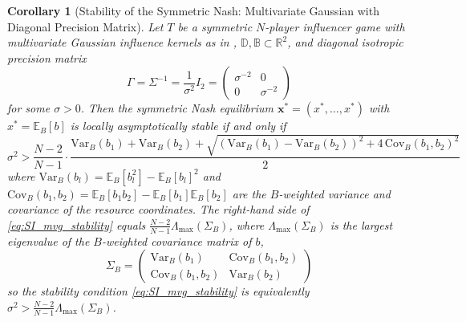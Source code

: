 \documentclass{article}
\newtheorem{corollary}{Corollary}[theorem]
\begin{document}
            \begin{corollary}[Stability of the Symmetric Nash: Multivariate Gaussian with 
                Diagonal Precision Matrix]\label{cor:SI_mvg_stability}Let $T$ be a symmetric $N$-player influencer game with multivariate Gaussian influence kernels as in , $\mathbb{D}, \mathbb{B} \subset \mathbb{R}^2$, and diagonal isotropic precision matrix
                \begin{equation}
                    \Gamma = \Sigma^{-1} = \frac{1}{\sigma^2}I_2 = 
                    \begin{pmatrix} 
                        \sigma^{-2} & 0 \\ 
                        0 & \sigma^{-2} 
                    \end{pmatrix}
                \end{equation}
                for some $\sigma > 0$. Then the symmetric Nash equilibrium $\mathbf{x}^* = (x^*,\ldots,x^*)$ with $x^* = \mathbb{E}_B[b]$ is locally asymptotically stable if and only if
                \begin{equation}\label{eq:SI_mvg_stability}
                    \sigma^2 > \frac{N-2}{N-1}\cdot\frac{\mathrm{Var}_B(b_1) + \mathrm{Var}_B(b_2) + \sqrt{\left(\mathrm{Var}_B(b_1) - \mathrm{Var}_B(b_2)\right)^2 + 4\,\mathrm{Cov}_B(b_1,b_2)^2}}{2}
                \end{equation}
                where $\mathrm{Var}_B(b_l) = \mathbb{E}_B[b_l^2] - \mathbb{E}_B[b_l]^2$ and $\mathrm{Cov}_B(b_1,b_2) = \mathbb{E}_B[b_1 b_2] - \mathbb{E}_B[b_1]\mathbb{E}_B[b_2]$ are the $B$-weighted variance and covariance of the resource coordinates. The right-hand side of \cref{eq:SI_mvg_stability} equals $\frac{N-2}{N-1}\Lambda_{\max}(\Sigma_B)$, where $\Lambda_{\max}(\Sigma_B)$ is the largest eigenvalue of the $B$-weighted covariance matrix of $b$,
                \begin{equation}
                    \Sigma_B = \begin{pmatrix} \mathrm{Var}_B(b_1) & \mathrm{Cov}_B(b_1,b_2) \\ \mathrm{Cov}_B(b_1,b_2) & \mathrm{Var}_B(b_2) \end{pmatrix}
                \end{equation}
                so the stability condition \cref{eq:SI_mvg_stability} is equivalently $\sigma^2 > \frac{N-2}{N-1}\Lambda_{\max}(\Sigma_B)$.
            \end{corollary}
            
\end{document}
